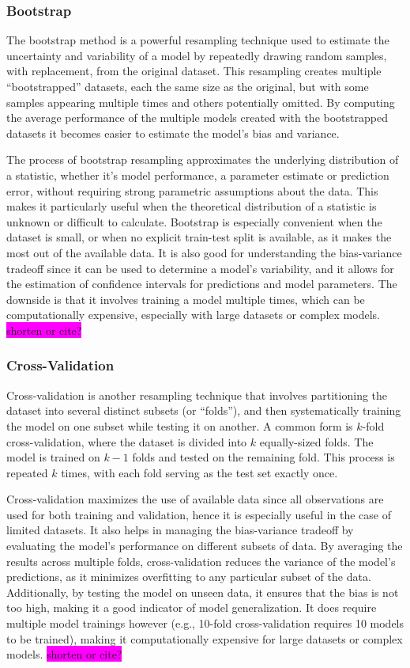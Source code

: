 \documentclass[aps,pra,english,notitlepage,reprint,nofootinbib]{revtex4-1}  %
\begin{document}
\subsubsection{Bootstrap}
The bootstrap method is a powerful resampling technique used to estimate the uncertainty and variability of a model by repeatedly drawing random samples, with replacement, from the original dataset. This resampling creates multiple ``bootstrapped'' datasets, each the same size as the original, but with some samples appearing multiple times and others potentially omitted. By computing the average performance of the multiple models created with the bootstrapped datasets it becomes easier to estimate the model's bias and variance.

The process of bootstrap resampling approximates the underlying distribution of a statistic, whether it's model performance, a parameter estimate or prediction error, without requiring strong parametric assumptions about the data. This makes it particularly useful when the theoretical distribution of a statistic is unknown or difficult to calculate. Bootstrap is especially convenient when the dataset is small, or when no explicit train-test split is available, as it makes the most out of the available data. It is also good for understanding the bias-variance tradeoff since it can be used to determine a model's variability, and it allows for the estimation of confidence intervals for predictions and model parameters. The downside is that it involves training a model multiple times, which can be computationally expensive, especially with large datasets or complex models. \colorbox{magenta}{shorten or cite?}


\subsubsection{Cross-Validation}
Cross-validation is another resampling technique that involves partitioning the dataset into several distinct subsets (or ``folds''), and then systematically training the model on one subset while testing it on another. A common form is $k$-fold cross-validation, where the dataset is divided into $k$ equally-sized folds. The model is trained on $k-1$ folds and tested on the remaining fold. This process is repeated $k$ times, with each fold serving as the test set exactly once.

Cross-validation maximizes the use of available data since all observations are used for both training and validation, hence it is especially useful in the case of limited datasets. It also helps in managing the bias-variance tradeoff by evaluating the model's performance on different subsets of data. By averaging the results across multiple folds, cross-validation reduces the variance of the model's predictions, as it minimizes overfitting to any particular subset of the data. Additionally, by testing the model on unseen data, it ensures that the bias is not too high, making it a good indicator of model generalization. It does require multiple model trainings however (e.g., 10-fold cross-validation requires 10 models to be trained), making it computationally expensive for large datasets or complex models.
\colorbox{magenta}{shorten or cite?}
\end{document}
